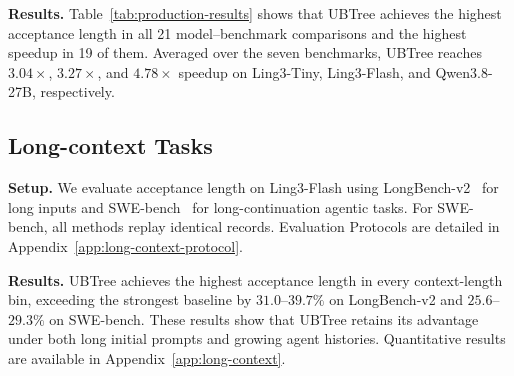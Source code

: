 \noindent\textbf{Results.}
Table~\ref{tab:production-results} shows that UBTree achieves the highest acceptance length in all 21 model--benchmark comparisons and the highest speedup in 19 of them. Averaged over the seven benchmarks, UBTree reaches $3.04\times$, $3.27\times$, and $4.78\times$ speedup on Ling3-Tiny, Ling3-Flash, and Qwen3.8-27B, respectively.


\subsection{Long-context Tasks}
\label{sec:exp-long-context}

\noindent\textbf{Setup.}
We evaluate acceptance length on Ling3-Flash using LongBench-v2~\citep{bai2024longbenchv2} for long inputs and SWE-bench~\citep{jimenez2024swebench} for long-continuation agentic tasks. For SWE-bench, all methods replay identical records. Evaluation Protocols are detailed in Appendix~\ref{app:long-context-protocol}.

\noindent\textbf{Results.}
UBTree achieves the highest acceptance length in every context-length bin, exceeding the strongest baseline by $31.0$--$39.7\%$ on LongBench-v2 and $25.6$--$29.3\%$ on SWE-bench. These results show that UBTree retains its advantage under both long initial prompts and growing agent histories. Quantitative results are available in Appendix~\ref{app:long-context}.

